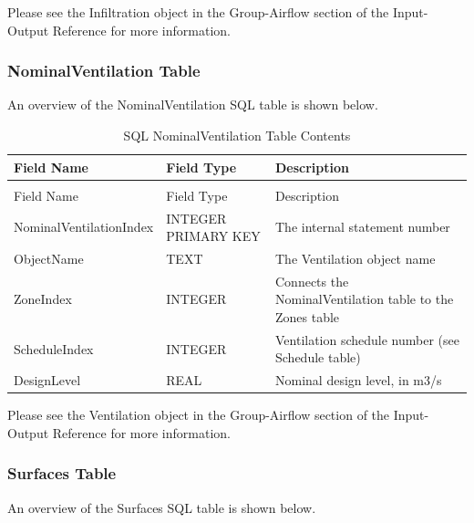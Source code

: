Please see the Infiltration object in the Group-Airflow section of the Input-Output Reference for more information.

\subsubsection{NominalVentilation Table}

An overview of the NominalVentilation SQL table is shown below.

\begin{longtable}[c]{>{\raggedright}p{1.5in}>{\raggedright}p{1.5in}>{\raggedright}p{3.0in}}
\caption{SQL NominalVentilation Table Contents \label{table:table-24.-sql-nominalventilation-table}} \tabularnewline
\toprule
Field Name & Field Type & Description \tabularnewline
\midrule
\endfirsthead

\caption[]{SQL NominalVentilation Table Contents} \tabularnewline
\toprule
Field Name & Field Type & Description \tabularnewline
\midrule
\endhead

Nominal\-Ventilation\-Index & INTEGER PRIMARY KEY & The internal statement number \tabularnewline
ObjectName & TEXT & The Ventilation object name \tabularnewline
ZoneIndex & INTEGER & Connects the NominalVentilation table to the Zones table \tabularnewline
ScheduleIndex & INTEGER & Ventilation schedule number (see Schedule table) \tabularnewline
DesignLevel & REAL & Nominal design level, in m3/s \tabularnewline
\bottomrule
\end{longtable}

Please see the Ventilation object in the Group-Airflow section of the Input-Output Reference for more information.

\subsubsection{Surfaces Table}

An overview of the Surfaces SQL table is shown below.


